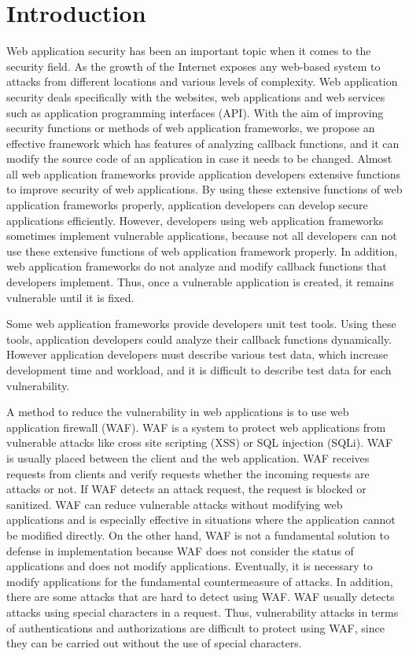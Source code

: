 \documentclass[conference]{IEEEtran}
\begin{document}
\section{Introduction}
Web application security has been an important topic when it comes to the security field.
As the growth of the Internet exposes any web-based system to attacks from different locations and various levels of complexity.
Web application security deals specifically with the websites, web applications and web services such as application programming interfaces (API).
With the aim of improving security functions or methods of web application frameworks, we propose an effective framework which has features of analyzing callback functions, and it can modify the source code of an application in case it needs to be changed.
Almost all web application frameworks provide application developers extensive functions to improve security of web applications.
By using these extensive functions of web application frameworks properly, application developers can develop secure applications efficiently.
However, developers using web application frameworks sometimes implement vulnerable applications, because not all developers can not use these extensive functions of web application framework properly.
In addition, web application frameworks do not analyze and modify callback functions that developers implement.
Thus, once a vulnerable application is created, it remains vulnerable until it is fixed.

Some web application frameworks provide developers unit test tools.
Using these tools, application developers could analyze their callback functions dynamically.
However application developers must describe various test data, which increase development time and workload, and it is difficult to describe test data for each vulnerability.

A method to reduce the vulnerability in web applications is to use web application firewall (WAF)\cite{kruegel2003anomaly, epp2017anomaly, makiou2014improving, krueger2010tokdoc, ito2018web}.
WAF is a system to protect web applications from vulnerable attacks like cross site scripting (XSS)\cite{subramaniyaswamy2018securing} or SQL injection (SQLi)\cite{halfond2005amnesia}.
WAF is usually placed between the client and the web application.
WAF receives requests from clients and verify requests whether the incoming requests are attacks or not.
If WAF detects an attack request, the request is blocked or sanitized.
WAF can reduce vulnerable attacks without modifying web applications and is especially effective in situations where the application cannot be modified directly.
On the other hand, WAF is not a fundamental solution to defense in implementation because WAF does not consider the status of applications and does not modify applications.
Eventually, it is necessary to modify applications for the fundamental countermeasure of attacks.
In addition, there are some attacks that are hard to detect using WAF.
WAF usually detects attacks using special characters in a request.
Thus, vulnerability attacks in terms of authentications and authorizations are difficult to protect using WAF,  since they can be carried out without the use of special characters.
\end{document}
